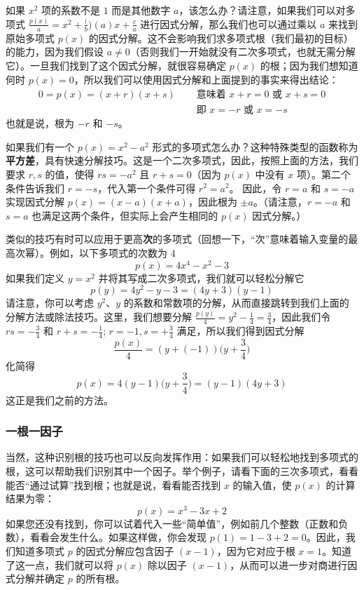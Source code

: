 如果 $x^2$ 项的系数不是 $1$ 而是其他数字 $a$，该怎么办？请注意，如果我们可以对多项式 $\frac{p(x)}{a} = x^2+\frac(b)(a)x+\frac{c}{a}$ 进行因式分解，那么我们也可以通过乘以 $a$ 来找到原始多项式 $p(x)$ 的因式分解。这不会影响我们求多项式根（我们最初的目标）的能力，因为我们假设 $a \ne 0$（否则我们一开始就没有二次多项式，也就无需分解它）。一旦我们找到了这个因式分解，就很容易确定 $p(x)$ 的根；因为我们想知道何时 $p(x) = 0$，所以我们可以使用因式分解和上面提到的事实来得出结论：
\begin{align*}
    0 = p(x) = (x + r)(x + s) & \quad \text{ 意味着 } x + r = 0 \text{ 或 } x + s = 0 \\
    & \quad \text{ 即 } x = -r \text{ 或 } x = -s
\end{align*}
也就是说，根为 $-r$ 和 $-s$。

如果我们有一个 $p(x) = x^2 - a^2$ 形式的多项式怎么办？这种特殊类型的函数称为\textbf{平方差}，具有快速分解技巧。这是一个二次多项式，因此，按照上面的方法，我们要求 $r,s$ 的值，使得 $rs = -a^2$ 且 $r + s = 0$（因为 $p(x)$ 中没有 $x$ 项）。第二个条件告诉我们 $r = -s$，代入第一个条件可得 $r^2 = a^2$。 因此，令 $r = a$ 和 $s = -a$ 实现因式分解 $p(x) = (x - a)(x + a)$，因此根为 $\pm a$。（请注意，$r = -a$ 和 $s = a$ 也满足这两个条件，但实际上会产生相同的 $p(x)$ 因式分解。）

类似的技巧有时可以应用于更高\textbf{次}的多项式（回想一下，“次”意味着输入变量的最高次幂）。例如，以下多项式的次数为 4
\[p(x) = 4x^4 - x^2 - 3\]
如果我们定义 $y = x^2$ 并将其写成二次多项式，我们就可以轻松分解它
\[p(y) = 4y^2 - y - 3 = (4y + 3)(y - 1)\]
请注意，你可以考虑 $y^2$、$y$ 的系数和常数项的分解，从而直接跳转到我们上面的分解方法或除法技巧。这里，我们想要分解 $\frac{p(y)}{4} = y^2-\frac{1}{4}=\frac{3}{4}$，因此我们令 $rs = -\frac{3}{4}$ 和 $r + s =-\frac{1}{4}$; $r=-1, s=+\frac{3}{4}$ 满足，所以我们得到因式分解
\[\frac{p(x)}{4} = (y+(-1))\Big(y+\frac{3}{4}\Big)\]
化简得
\[p(x) = 4(y-1)\Big(y+\frac{3}{4}\Big) = (y-1)(4y+3)\]
这正是我们之前的方法。

\subsubsection*{一根一因子}

当然，这种识别根的技巧也可以反向发挥作用：如果我们可以轻松地找到多项式的根，这可以帮助我们识别其中一个因子。举个例子，请看下面的三次多项式，看看能否“通过试算”找到根；也就是说，看看能否找到 $x$ 的输入值，使 $p(x)$ 的计算结果为零：
\[p(x) = x^3 - 3x + 2\]
如果您还没有找到，你可以试着代入一些“简单值”，例如前几个整数（正数和负数），看看会发生什么。如果这样做，你会发现 $p(1) = 1 - 3 + 2 = 0$。因此，我们知道多项式 $p$ 的因式分解应包含因子 $(x - 1)$，因为它对应于根 $x = 1$。知道了这一点，我们就可以将 $p(x)$ 除以因子 $(x - 1)$，从而可以进一步对商进行因式分解并确定 $p$ 的所有根。


